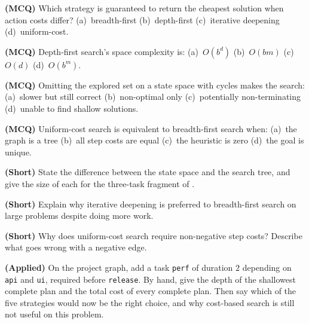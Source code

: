 \begin{reviewq}
  \item \textbf{(MCQ)} Which strategy is guaranteed to return the cheapest
        solution when action costs differ? (a)~breadth-first (b)~depth-first
        (c)~iterative deepening (d)~uniform-cost.
  \item \textbf{(MCQ)} Depth-first search's space complexity is:
        (a)~$O(b^{d})$ (b)~$O(bm)$ (c)~$O(d)$ (d)~$O(b^{m})$.
  \item \textbf{(MCQ)} Omitting the explored set on a state space with cycles makes
        the search: (a)~slower but still correct (b)~non-optimal only
        (c)~potentially non-terminating (d)~unable to find shallow solutions.
  \item \textbf{(MCQ)} Uniform-cost search is equivalent to breadth-first search
        when: (a)~the graph is a tree (b)~all step costs are equal (c)~the
        heuristic is zero (d)~the goal is unique.
  \item \textbf{(Short)} State the difference between the state space and the
        search tree, and give the size of each for the three-task fragment of
        .
  \item \textbf{(Short)} Explain why iterative deepening is preferred to
        breadth-first search on large problems despite doing more work.
  \item \textbf{(Short)} Why does uniform-cost search require non-negative step
        costs? Describe what goes wrong with a negative edge.
  \item \textbf{(Applied)} On the project graph, add a task \texttt{perf} of
        duration $2$ depending on \texttt{api} and \texttt{ui}, required before
        \texttt{release}. By hand, give the depth of the shallowest complete plan
        and the total cost of every complete plan. Then say which of the five
        strategies would now be the right choice, and why cost-based search is
        still not useful on this problem.
\end{reviewq}
